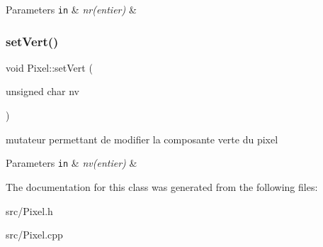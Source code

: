 \begin{DoxyParams}[1]{Parameters}
\mbox{\tt in}  & {\em nr(entier)} & \\
\hline
\end{DoxyParams}
\mbox{\label{classPixel_a3678479783c7c839ee653be96a7e0757}} 
\subsubsection{\texorpdfstring{set\+Vert()}{setVert()}}
{\footnotesize\ttfamily void Pixel\+::set\+Vert (\begin{DoxyParamCaption}\item[{unsigned char}]{nv }\end{DoxyParamCaption})}



mutateur permettant de modifier la composante verte du pixel 


\begin{DoxyParams}[1]{Parameters}
\mbox{\tt in}  & {\em nv(entier)} & \\
\hline
\end{DoxyParams}


The documentation for this class was generated from the following files\+:\begin{DoxyCompactItemize}
\item 
src/Pixel.\+h\item 
src/Pixel.\+cpp\end{DoxyCompactItemize}
